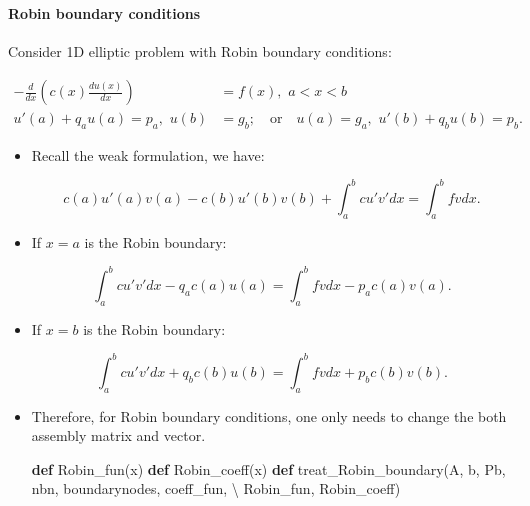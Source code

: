 \documentclass[11pt]{article}
\newenvironment{Shaded}{}{}
\newcommand{\KeywordTok}[1]{\textcolor[rgb]{0.00,0.44,0.13}{\textbf{{#1}}}}
\newcommand{\NormalTok}[1]{{#1}}
\newcommand{\OperatorTok}[1]{\textcolor[rgb]{0.40,0.40,0.40}{{#1}}}
\begin{document}
    \begin{center}
    \end{center}
    { \hspace*{\fill} \\}
    
    \paragraph{Robin boundary conditions}\label{robin-boundary-conditions}

Consider 1D elliptic problem with Robin boundary conditions:

\begin{align}
   -\frac{d}{dx}\left(c(x)\frac{d u(x)}{dx}\right) & = f(x),\,\, a < x < b \\
   u'(a) + q_a u(a) = p_a,\,\,u(b) & = g_b;\quad\text{or}\quad u(a) = g_a,\,\,u'(b) + q_b u(b) = p_b.
\end{align}

\begin{itemize}
\item
  Recall the weak formulation, we have:

  \begin{equation}
  c(a)u'(a)v(a) - c(b)u'(b)v(b) + \int_a^b cu'v'dx = \int_a^b fv dx.
  \end{equation}
\item
  If \(x = a\) is the Robin boundary:

  \begin{equation}
   \int_a^b cu'v'dx - q_a c(a)u(a)= \int_a^b fv dx - p_ac(a)v(a).
  \end{equation}
\item
  If \(x = b\) is the Robin boundary:

  \begin{equation}
   \int_a^b cu'v'dx + q_b c(b)u(b)= \int_a^b fv dx + p_bc(b)v(b).
  \end{equation}
\item
  Therefore, for Robin boundary conditions, one only needs to change the
  both assembly matrix and vector.

\begin{Shaded}
\begin{Highlighting}[]
\KeywordTok{def}\NormalTok{ Robin_fun(x)}
\KeywordTok{def}\NormalTok{ Robin_coeff(x)}
\KeywordTok{def}\NormalTok{ treat_Robin_boundary(A, b, Pb, nbn, boundarynodes, coeff_fun, }\OperatorTok{\textbackslash{}}
\NormalTok{                        Robin_fun, Robin_coeff)}
\end{Highlighting}
\end{Shaded}
\end{itemize}
\end{document}
